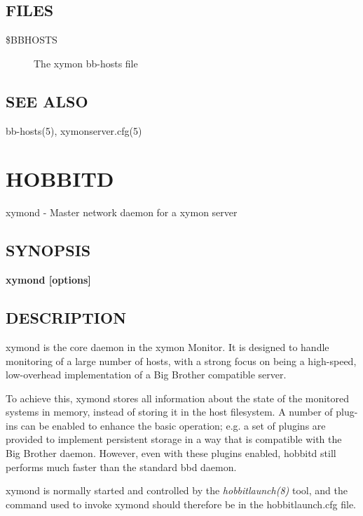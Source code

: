 \subsection{FILES}
\begin{description}
\item[\$BBHOSTS] The xymon bb-hosts file 

 


\end{description}
\subsection{SEE ALSO}
bb-hosts(5), xymonserver.cfg(5) 

  
%
\newpage
\section{HOBBITD}

 xymond - Master network daemon for a xymon server
 \subsection{SYNOPSIS}
\textbf{xymond [options]}


 
\subsection{DESCRIPTION}
 xymond is the core daemon in the xymon Monitor. It is designed to handle monitoring of a large number of hosts, with a strong focus on being a high-speed, low-overhead implementation of a Big Brother compatible server. 

  To achieve this, xymond stores all information about the state of the monitored systems in memory, instead of storing it in the host filesystem. A number of plug-ins can be enabled to enhance the basic operation; e.g. a set of plugins are provided to implement persistent storage in a way that is compatible with the Big Brother daemon. However, even with these plugins enabled, hobbitd still performs much faster than the standard bbd daemon. 


  xymond is normally started and controlled by the \emph{hobbitlaunch(8)}
 tool, and the command used to invoke xymond should therefore be in the hobbitlaunch.cfg file. 


